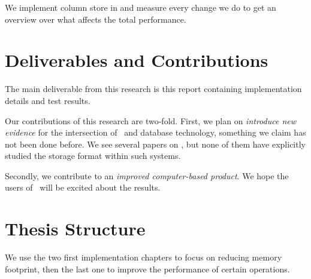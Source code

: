 We implement column store in \gap and measure every change we do to get an overview over what affects the total performance.


\section{Deliverables and Contributions}
\label{sec:Deliverables and Contributions}
The main deliverable from this research is this report containing implementation details and test results.

Our contributions of this research are two-fold. First, we plan on \textit{introduce new evidence} for the intersection of \mdd~and database technology, something we claim has not been done before. We see several papers on \mdd, but none of them have explicitly studied the storage format within such systems.

Secondly, we contribute to an \textit{improved computer-based product}. We hope the users of \gap~will be excited about the results.


\section{Thesis Structure}
\label{sec:Thesis Structure}
We use the two first implementation chapters to focus on reducing memory footprint, then the last one to improve the performance of certain operations.

